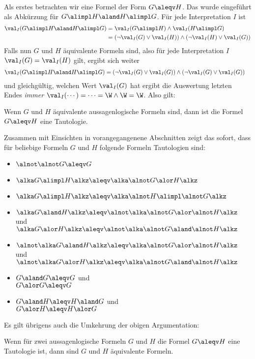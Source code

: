 Als erstes betrachten wir eine Formel der Form $G\aleqv H$.
%
Das wurde eingeführt als Abkürzung für $G\alimpl H \aland H\alimpl G$.
%
Für jede Interpretation $I$ ist
\begin{align*}
  \val_I(G\alimpl H \aland H\alimpl G) 
  &= \val_I(G\alimpl H) \land \val_I(H\alimpl G)\\
  &= (\lnot\val_I(G)\lor\val_I(H)) \land (\lnot\val_I(H)\lor\val_I(G))
\end{align*}
%
Falls nun $G$
und $H$
äquivalente Formeln sind, also für jede Interpretation $I$
$\val_I(G)=\val_I(H)$ gilt, ergibt sich weiter
\begin{align*}
  \val_I(G\alimpl H \aland H\alimpl G) 
  &= (\lnot\val_I(G)\lor\val_I(G)) \land (\lnot\val_I(G)\lor\val_I(G))
\end{align*}
%
und gleichgültig, welchen Wert $\val_I(G)$
hat ergibt die Auswertung letzten Endes \emph{immer}
$\val_I(\cdots)=\cdots = \W\land\W=\W$.
%
Also gilt:
%
\begin{lemma}
  Wenn $G$ und $H$
  äquivalente aussagenlogische Formeln sind, dann ist die Formel
  $G\aleqv H$ eine Tautologie.
\end{lemma}
%
Zusammen mit Einsichten in vorangegangenene Abschnitten zeigt das
sofort, dass für beliebige Formeln $G$
und $H$ \zB folgende Formeln Tautologien sind:
%
\begin{itemize}
\item $\alnot \alnot G \aleqv G$
\item $\alka G\alimpl H\alkz \aleqv \alka\alnot G\alor H\alkz$
\item $\alka G\alimpl H\alkz \aleqv \alka \alnot H \alimpl\alnot G\alkz$
\item $\alka G\aland H\alkz \aleqv \alnot\alka \alnot G \alor\alnot H\alkz$ und \\
   $\alka G\alor H\alkz \aleqv \alnot\alka \alnot G \aland\alnot H\alkz$
\item $\alnot\alka G\aland H\alkz \aleqv \alka \alnot G \alor\alnot H\alkz$ und \\
   $\alnot\alka G\alor H\alkz \aleqv \alka \alnot G \aland\alnot H\alkz$
\item $G\aland G \aleqv G$ und\\
  $G\alor G \aleqv G$
\item $G\aland H \aleqv H\aland G$ und \\
  $G\alor H \aleqv H\alor G$
\end{itemize}
%
Es gilt übrigens auch die Umkehrung der obigen Argumentation:
%
\begin{lemma}
  Wenn für zwei aussagenlogische Formeln $G$
  und $H$
  die Formel $G\aleqv H$
  eine Tautologie ist, dann sind $G$ und $H$ äquivalente Formeln.
\end{lemma}
